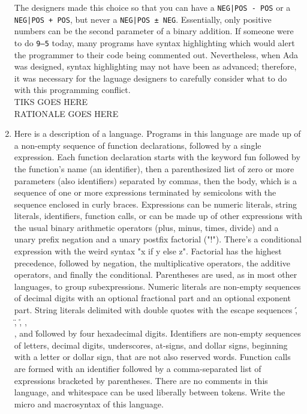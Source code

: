 \documentclass{article}
\begin{document}
\begin{enumerate}
    The designers made this choice so that you can have a \texttt{NEG|POS - POS} or a \texttt{NEG|POS + POS}, but never a \texttt{NEG|POS ± NEG}. Essentially, only positive numbers can be the second parameter of a binary addition. If someone were to do \texttt{9--5} today, many programs have syntax highlighting which would alert the programmer to their code being commented out. Nevertheless, when Ada was designed, syntax highlighting may not have been as advanced; therefore, it was necessary for the laguage designers to carefully consider what to do with this programming conflict. \\
    TIKS GOES HERE \\
    RATIONALE GOES HERE \\
    \pagebreak
    \item Here is a description of a language. Programs in this language are made up of a non-empty sequence of function declarations, followed by a single expression. Each function declaration starts with the keyword fun followed by the function's name (an identifier), then a parenthesized list of zero or more parameters (also identifiers) separated by commas, then the body, which is a sequence of one or more expressions terminated by semicolons with the sequence enclosed in curly braces. Expressions can be numeric literals, string literals, identifiers, function calls, or can be made up of other expressions with the usual binary arithmetic operators (plus, minus, times, divide) and a unary prefix negation and a unary postfix factorial ("!"). There's a conditional expression with the weird syntax "x if y else z". Factorial has the highest precedence, followed by negation, the multiplicative operators, the additive operators, and finally the conditional. Parentheses are used, as in most other languages, to group subexpressions. Numeric literals are non-empty sequences of decimal digits with an optional fractional part and an optional exponent part. String literals delimited with double quotes with the escape sequences \', \", \r, \n, \\, and \u followed by four hexadecimal digits. Identifiers are non-empty sequences of letters, decimal digits, underscores, at-signs, and dollar signs, beginning with a letter or dollar sign, that are not also reserved words. Function calls are formed with an identifier followed by a comma-separated list of expressions bracketed by parentheses. There are no comments in this language, and whitespace can be used liberally between tokens.
Write the micro and macrosyntax of this language.
\end{enumerate}
\end{document}
